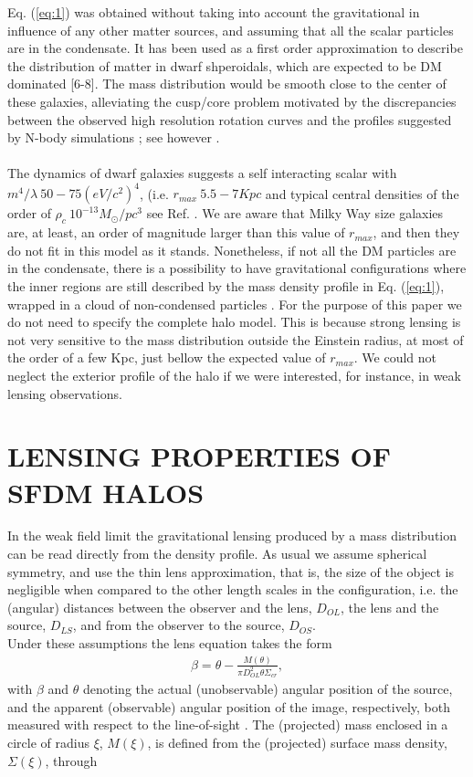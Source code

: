 \documentclass[10pt,letterpaper,twocolumn]{article}
\begin{document}
Eq. (\ref{eq:1}) was obtained without taking into account the gravitational in influence of any other matter sources, and assuming that all the scalar particles are in the condensate. It has been used as a first order approximation to describe the distribution of matter in dwarf shperoidals, which are expected to be DM dominated [6-8]. The mass distribution would be smooth close to the center of these galaxies, alleviating the cusp/core problem motivated by the discrepancies between the observed high resolution rotation curves and the profiles suggested by N-body simulations
\cite{9}; see however \cite{10}.\\\\
The dynamics of dwarf galaxies suggests a self interacting
scalar with $m^{4}/\lambda ~ 50 - 75 (eV/c^{2})^{4}$, (i.e. $r_{max} ~ 5.5 - 7Kpc$  and typical central densities of the
order of $\rho_{c} ~ 10^{-13} M_{\odot}/pc^3$ see Ref. \cite{6}. We are aware
that Milky Way size galaxies are, at least, an order of
magnitude larger than this value of $r_{max}$, and then they do not fit in this model as it stands. Nonetheless, if not all the DM particles are in the condensate, there is a possibility to have gravitational configurations where the inner regions are still described by the mass density profile in Eq. (\ref{eq:1}), wrapped in a cloud of non-condensed particles \cite{11}. For the purpose of this paper we do not
need to specify the complete halo model. This is because
strong lensing is not very sensitive to the mass distribution
outside the Einstein radius, at most of the order of
a few Kpc, just bellow the expected value of $r_{max}$. We
could not neglect the exterior profile of the halo if we were
interested, for instance, in weak lensing observations.
\section[II]{\centering \small {LENSING PROPERTIES OF SFDM HALOS}}
In the weak field limit the gravitational lensing produced
by a mass distribution can be read directly from
the density profile. As usual we assume spherical symmetry,
and use the thin lens approximation, that is, the size
of the object is negligible when compared to the other
length scales in the configuration, i.e. the (angular) distances
between the observer and the lens, $D_{OL}$, the lens
and the source, $D_{LS}$, and from the observer to the source,
$D_{OS}$.\\
Under these assumptions the lens equation takes the
form
\begin{eqnarray}
\label{eq:2}
\beta=\theta-\frac{M(\theta)}{\pi{D^{2}_{OL}}\theta\Sigma_{cr}},
\end{eqnarray}
with $\beta$ and $\theta$ denoting the actual (unobservable) angular position of the source, and the apparent (observable) angular position of the image, respectively, both measured with respect to the line-of-sight \cite{12}. The (projected) mass enclosed in a circle of radius $\xi$, $M(\xi)$, is defined from the (projected) surface mass density, $\Sigma(\xi)$, through
\end{document}
